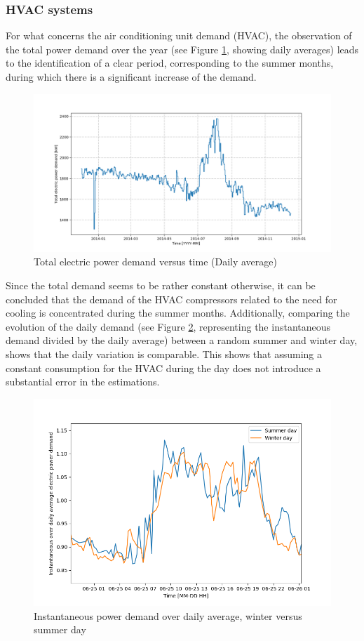 \documentclass[preprint,12pt]{elsarticle}
\begin{document}
\subsubsection*{HVAC systems}

For what concerns the air conditioning unit demand (HVAC), the observation of the total power demand over the year (see Figure \ref{fig:pelvstime}, showing daily averages) leads to the identification of a clear period, corresponding to the summer months, during which there is a significant increase of the demand. 

\begin{figure}
	\centering
	\includegraphics[width=0.9\linewidth]{Figures/Pel_vs_time}
	\caption[Total electric power demand versus time (Daily average)]{Total electric power demand versus time (Daily average)}
	\label{fig:pelvstime}
\end{figure}

Since the total demand seems to be rather constant otherwise, it can be concluded that the demand of the HVAC compressors related to the need for cooling is concentrated during the summer months. Additionally, comparing the evolution of the daily demand (see Figure \ref{fig:pelrelvstime}, representing the instantaneous demand divided by the daily average) between a random summer and winter day, shows that the daily variation is comparable. This shows that assuming a constant consumption for the HVAC during the day does not introduce a substantial error in the estimations.

\begin{figure}
	\centering
	\includegraphics[width=0.9\linewidth]{Figures/PelRel_vs_time}
	\caption{Instantaneous power demand over daily average, winter versus summer day}
	\label{fig:pelrelvstime}
\end{figure}
\end{document}
